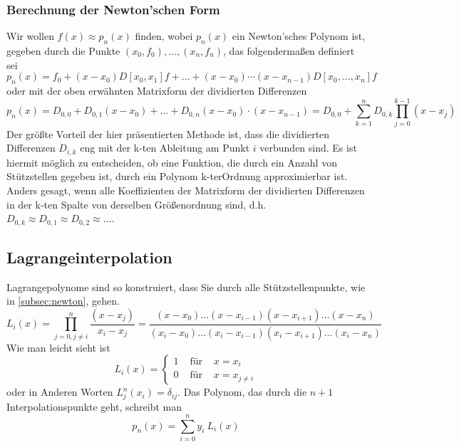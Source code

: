 \subsubsection{Berechnung der Newton'schen Form}
Wir wollen $f(x)\approx p_n(x)$ finden, wobei $p_n(x)$ ein Newton'sches Polynom
ist, gegeben durch die Punkte $(x_0,f_0),\dots,(x_n,f_n)$, das folgendermaßen
definiert sei
\begin{equation}
	p_n(x)=f_0+(x-x_0)D[x_0,x_1]f+\dots +(x-x_0)\cdots (x-x_{n-1})D[x_0,\dots,x_n]f
	\label{eq:newtonpoly}
\end{equation}
oder mit der oben erwähnten Matrixform der dividierten Differenzen
\[
p_n(x)=D_{0,0}+D_{0,1}(x-x_0)+\dots +D_{0,n}(x-x_0)\cdot(x-x_{n-1})=D_{0,0}+\sum_{k=1}^nD_{0,k}\prod_{j=0}^{k-1}(x-x_j)
\]
Der größte Vorteil der hier präsentierten Methode ist, dass die dividierten Differenzen 
$D_{i,k}$ eng mit der k-ten Ableitung am Punkt $i$ verbunden sind.  Es ist
hiermit möglich zu entscheiden, ob eine Funktion, die durch ein Anzahl von
Stützstellen gegeben ist,  durch ein Polynom k-terOrdnung approximierbar ist.  Anders
gesagt, wenn alle Koeffizienten der  Matrixform der dividierten Differenzen in
der k-ten Spalte von derselben Größenordnung sind, d.h.  $D_{0,k}\approx
D_{0,1}\approx D_{0,2}\approx\dots$.
\subsection{Lagrangeinterpolation}
Lagrangepolynome sind so konstruiert, dass Sie durch alle Stützstellenpunkte, wie in \ref{subsec:newton}, gehen.
\[
L_i(x)=\prod_{j=0,j\neq i}^n\frac{(x-x_j)}{x_i-x_j}=\frac{(x-x_0)\ldots(x-x_{i-1})(x-x_{i+1})\ldots(x-x_n)}{(x_i-x_0)\ldots(x_i-x_{i-1})(x_i-x_{i+1})\ldots(x_i-x_n)}
\]
Wie man leicht sieht ist
\[
L_i(x)=\left\{
\begin{array}{rcl}
1&\mbox{ für }&x=x_i\\ 
0&\mbox{ für }&x=x_{j\ne i}
\end{array}\right.
\]
oder in Anderen Worten $L^n_j(x_i)=\delta_{ij}$. Das Polynom, das durch die 
$n+1$ Interpolationspunkte geht, schreibt man
\[ p_n(x)=\sum_{i=0}^n y_i\ L_i(x) \]
